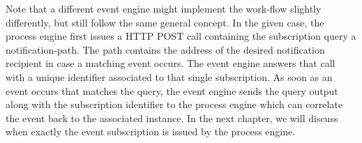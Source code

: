 Note that a different event engine might implement the work-flow slightly differently, but still follow the same general concept.
In the given case, the process engine first issues a \acs{HTTP} POST call containing the subscription query a notification-path. The path contains the address of the desired notification recipient in case a matching event occurs.
The event engine answers that call with a unique identifier associated to that single subscription.
As soon as an event occurs that matches the query, the event engine sends the query output along with the subscription identifier to the process engine which can correlate the event back to the associated instance.
In the next chapter, we will discuss when exactly the event subscription is issued by the process engine.








